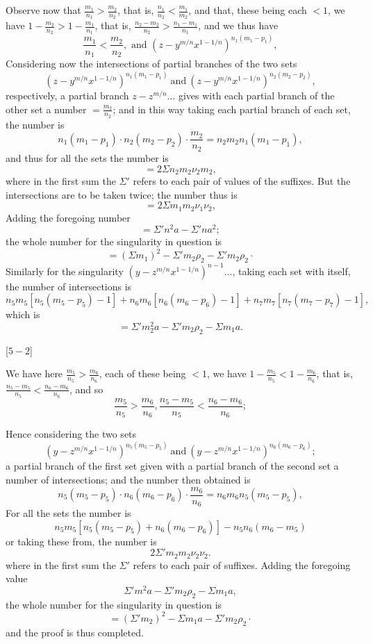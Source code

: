 \documentclass[12pt,a4paper,oneside]{book}
\newcommand{\paperref}[1]{\par\noindent\hfill[#1]\hfill\null\par}
\theoremstyle{plain}
\theoremstyle{definition}
\theoremstyle{remark}
\begin{document}
\newpage
Observe now that $\frac{m_1}{n_1}>\frac{m_2}{n_2}$, that is, $\frac{n_1}{n_2}<\frac{m_1}{m_2}$, and that, these being each $<1$, we have $1-\frac{m_2}{n_2}>1-\frac{m_1}{n_1}$, that is, $\frac{n_2-m_2}{n_2}>\frac{n_1-m_1}{n_1}$, and we thus have
\[
\frac{m_1}{n_1}<\frac{m_2}{n_2}, \text{ and } \left(z-y^{m/n}x^{1-1/n}\right)^{n_1(m_1-p_1)},
\]
Considering now the intersections of partial branches of the two sets
\[
\left(z-y^{m/n}x^{1-1/n}\right)^{n_1(m_1-p_1)}\ \text{and}\ \left(z-y^{m/n}x^{1-1/n}\right)^{n_2(m_2-p_2)},
\]
respectively, a partial branch $z-z^{m/n}\dots$ gives with each partial branch of the other set a number $=\frac{m_2}{n_2}$; and in this way taking each partial branch of each set, the number is
\[
n_1(m_1-p_1)\cdot n_2(m_2-p_2)\cdot \frac{m_2}{n_2}=n_2 m_2 n_1(m_1-p_1),
\]
and thus for all the sets the number is
\[
=2\Sigma n_2 m_2 \nu_2 m_2,
\]
where in the first sum the $\Sigma'$ refers to each pair of values of the suffixes. But the intersections are to be taken twice; the number thus is
\[
=2\Sigma m_1 m_2 \nu_1 \nu_2,
\]
Adding the foregoing number
\[
=\Sigma' n^2 a-\Sigma' n a^2;
\]
the whole number for the singularity in question is
\[
=(\Sigma m_1)^2-\Sigma' m_2 \rho_2-\Sigma' m_2 \rho_2 \cdot
\]
Similarly for the singularity $\left(y-z^{m/n}x^{1-1/n}\right)^{n-1}\dots$, taking each set with itself, the number of intersections is
\[
n_5 m_5 \left[n_5(m_5-p_5)-1\right] + n_6 m_6 \left[n_6(m_6-p_6)-1\right]+ n_7 m_7\left[n_7(m_7-p_7)-1\right],
\]
which is
\[
=\Sigma' m_2^2 a-\Sigma' m_2 \rho_2-\Sigma m_1 a.
\]

\paperref{\hfill $5-2$}

\newpage
We have here $\frac{m_5}{n_5}>\frac{m_6}{n_6}$, each of these being $<1$, we have $1-\frac{m_5}{n_5}<1-\frac{m_6}{n_6}$, that is, $\frac{n_5-m_5}{n_5}<\frac{n_6-m_6}{n_6}$, and so
\[
\frac{m_5}{n_5}>\frac{m_6}{n_6}, \frac{n_5-m_5}{n_5}<\frac{n_6-m_6}{n_6};
\]

Hence considering the two sets
\[
\left(y-z^{m/n}x^{1-1/n}\right)^{n_5(m_5-p_5)}\ \text{and}\ \left(y-z^{m/n}x^{1-1/n}\right)^{n_6(m_6-p_6)};
\]
a partial branch of the first set given with a partial branch of the second set a number of intersections; and the number then obtained is
\[
n_5(m_5-p_5)\cdot n_6(m_6-p_6)\cdot \frac{m_6}{n_6}=n_6 m_6 n_5(m_5-p_5),
\]
For all the sets the number is
\[
n_5 m_5 \left[n_5 (m_5-p_5)+ n_6(m_6-p_6) \right] - n_5 n_6 (m_6 - m_5)
\]
or taking these from, the number is
\[
2\Sigma'm_2 m_2 \nu_2 \nu_2.
\]
where in the first sum the $\Sigma'$ refers to each pair of suffixes. Adding the foregoing value
\[
\Sigma' m^2 a-\Sigma' m_2 \rho_2-\Sigma m_1 a,
\]
the whole number for the singularity in question is
\[
=(\Sigma' m_2)^2-\Sigma m_1 a-\Sigma' m_2 \rho_2 \cdot
\]
and the proof is thus completed.
\end{document}
